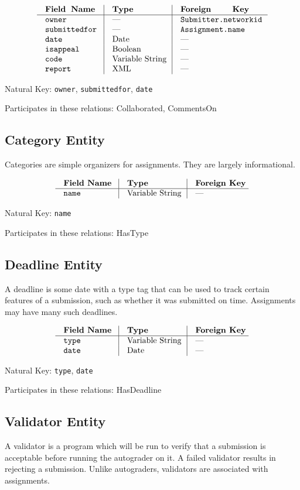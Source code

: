 $$\vbox{
  \offinterlineskip
  \halign{
    \strut \quad {\tt #}  & \vrule\quad #  & \vrule\quad # \cr
    {\bf Field Name}  & {\bf Type}  & {\bf Foreign Key}\cr
    \noalign{\hrule}    
    owner  & ---  & {\tt Submitter.networkid} \cr
    submittedfor  & ---  & {\tt Assignment.name} \cr
    date  & Date  & --- \cr
    isappeal  & Boolean  & --- \cr
    code  & Variable String  & --- \cr
    report  & XML  & --- \cr
  }
}$$

{\noindent
Natural Key: {\tt owner}, {\tt submittedfor}, {\tt date}\par\noindent
Participates in these relations: Collaborated, CommentsOn \par}

\subsection{Category Entity}
Categories are simple organizers for assignments. 
They are largely informational.

$$\vbox{
  \offinterlineskip
  \halign{
    \strut \quad {\tt #}  & \vrule\quad #  & \vrule\quad # \cr
    {\bf Field Name}  & {\bf Type}  & {\bf Foreign Key}\cr
    \noalign{\hrule}    
    name  & Variable String  & --- \cr
  }
}$$

{\noindent
Natural Key: {\tt name}\par\noindent
Participates in these relations: HasType \par}

\subsection{Deadline Entity}
A deadline is some date with a type tag that can be used to track certain
features of a submission, such as whether it was submitted on time.
Assignments may have many such deadlines.

$$\vbox{
  \offinterlineskip
  \halign{
    \strut \quad {\tt #}  & \vrule\quad #  & \vrule\quad # \cr
    {\bf Field Name}  & {\bf Type}  & {\bf Foreign Key}\cr
    \noalign{\hrule}    
    type  & Variable String  & --- \cr
    date  & Date  & --- \cr
  }
}$$

{\noindent
Natural Key: {\tt type}, {\tt date}\par\noindent
Participates in these relations: HasDeadline \par}

\subsection{Validator Entity}
A validator is a program which will be run to verify that a submission 
is acceptable before running the autograder on it.
A failed validator results in rejecting a submission.
Unlike autograders, validators are associated with assignments.

